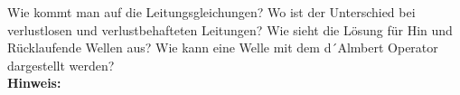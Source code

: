 \begin{question}[section=5,subsection=53,name={Leitungsgleichungen},difficulty=7,type=mdl,mode=exm,tags={}]
	Wie kommt man auf die Leitungsgleichungen? Wo ist der Unterschied bei verlustlosen und verlustbehafteten Leitungen? Wie sieht die Lösung für Hin und Rücklaufende Wellen aus? Wie kann eine Welle mit dem d´Almbert Operator dargestellt werden?
	\\ \textbf{Hinweis:}\\
	
\end{question}
\begin{solution}
	
\end{solution}